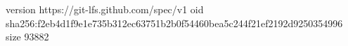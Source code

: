 version https://git-lfs.github.com/spec/v1
oid sha256:f2eb4d1f9e1e735b312ec63751b2b0f54460bea5c244f21ef2192d9250354996
size 93882
